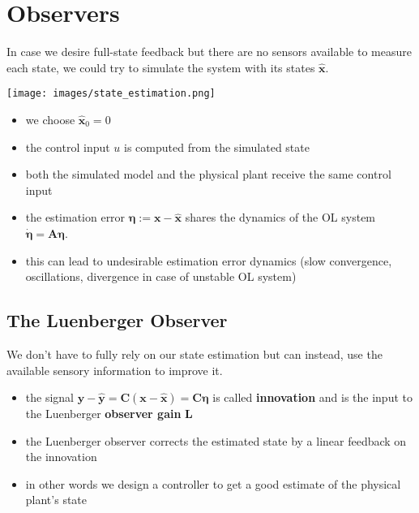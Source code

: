 \section{Observers}

In case we desire full-state feedback but there are no sensors available to measure each state, we could try to simulate the system with its states $\hat{\mathbf{x}}$.

\begin{center}
    \texttt{[image: images/state\_estimation.png]}
\end{center}

\begin{itemize}
    \item we choose $\hat{\mathbf{x}}_0=0$
    \item the control input $u$ is computed from the simulated state
    \item both the simulated model and the physical plant receive the same control input
\end{itemize}

\newpar{}

\begin{itemize}
    \item the estimation error $\mathbf{\eta}:=\mathbf{x}-\hat{\mathbf{x}}$ shares the dynamics of the OL system $\dot{\mathbf{\eta}}=\mathbf{A}\mathbf{\eta}$.
    \item this can lead to undesirable estimation error dynamics (slow convergence, oscillations, divergence in case of unstable OL system)
\end{itemize}

\subsection{The Luenberger Observer}
We don't have to fully rely on our state estimation but can instead, use the available sensory information to improve it.
\begin{itemize}
    \item the signal $\mathbf{y}-\hat{\mathbf{y}}=\mathbf{C}(\mathbf{x}-\hat{\mathbf{x}}) = \mathbf{C}\mathbf{\eta}$ is called \textbf{innovation} and is the input to the Luenberger \textbf{observer gain} $\mathbf{L}$
    \item the Luenberger observer corrects the estimated state by a linear feedback on the innovation
    \item in other words we design a controller to get a good estimate of the physical plant's state
\end{itemize}

